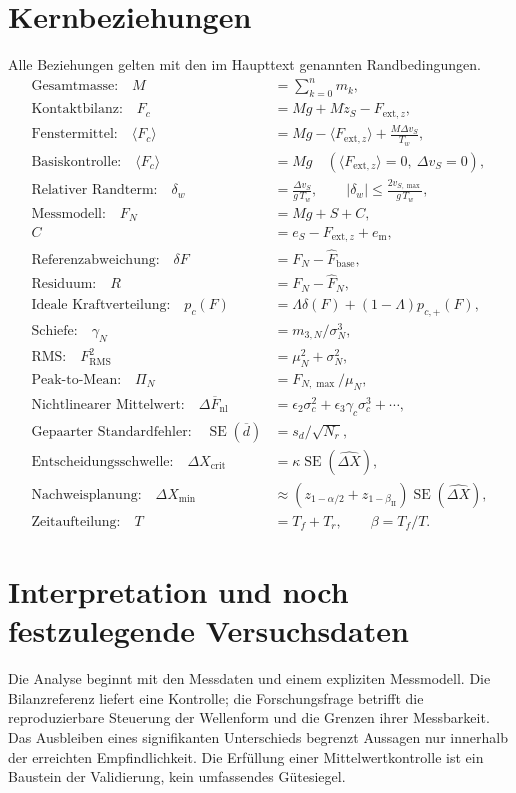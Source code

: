 \documentclass[11pt,a4paper]{article}
\newcommand{\SE}{\operatorname{SE}}
\begin{document}
\section{Kernbeziehungen}
Alle Beziehungen gelten mit den im Haupttext genannten Randbedingungen.
\begin{align*}
\text{Gesamtmasse:}\quad M&=\sum_{k=0}^{n}m_k,\\
\text{Kontaktbilanz:}\quad F_c&=Mg+M\ddot z_S-F_{\mathrm{ext},z},\\
\text{Fenstermittel:}\quad\langle F_c\rangle&=Mg-\langle F_{\mathrm{ext},z}\rangle+\frac{M\Delta v_S}{T_w},\\
\text{Basiskontrolle:}\quad\langle F_c\rangle&=Mg\quad(\langle F_{\mathrm{ext},z}\rangle=0,\ \Delta v_S=0),\\
\text{Relativer Randterm:}\quad\delta_w&=\frac{\Delta v_S}{g\,T_w},\qquad|\delta_w|\le\frac{2v_{S,\max}}{g\,T_w},\\
\text{Messmodell:}\quad F_N&=Mg+S+C,\\
C&=e_S-F_{\mathrm{ext},z}+e_{\mathrm m},\\
\text{Referenzabweichung:}\quad\delta F&=F_N-\hat F_{\mathrm{base}},\\
\text{Residuum:}\quad R&=F_N-\hat F_N,\\
\text{Ideale Kraftverteilung:}\quad p_c(F)&=\Lambda\delta(F)+(1-\Lambda)p_{c,+}(F),\\
\text{Schiefe:}\quad\gamma_N&=m_{3,N}/\sigma_N^3,\\
\text{RMS:}\quad F_{\mathrm{RMS}}^2&=\mu_N^2+\sigma_N^2,\\
\text{Peak-to-Mean:}\quad\Pi_N&=F_{N,\max}/\mu_N,\\
\text{Nichtlinearer Mittelwert:}\quad\Delta\overline F_{\mathrm{nl}}&=\epsilon_2\sigma_c^2+\epsilon_3\gamma_c\sigma_c^3+\cdots,\\
\text{Gepaarter Standardfehler:}\quad\SE(\overline d)&=s_d/\sqrt{N_r},\\
\text{Entscheidungsschwelle:}\quad\Delta X_{\mathrm{crit}}&=\kappa\SE(\widehat{\Delta X}),\\
\text{Nachweisplanung:}\quad\Delta X_{\min}&\approx(z_{1-\alpha/2}+z_{1-\beta_{\mathrm{II}}})\SE(\widehat{\Delta X}),\\
\text{Zeitaufteilung:}\quad T&=T_f+T_r,\qquad\beta=T_f/T.
\end{align*}

\section{Interpretation und noch festzulegende Versuchsdaten}
Die Analyse beginnt mit den Messdaten und einem expliziten Messmodell. Die Bilanzreferenz liefert eine Kontrolle; die Forschungsfrage betrifft die reproduzierbare Steuerung der Wellenform und die Grenzen ihrer Messbarkeit. Das Ausbleiben eines signifikanten Unterschieds begrenzt Aussagen nur innerhalb der erreichten Empfindlichkeit. Die Erfüllung einer Mittelwertkontrolle ist ein Baustein der Validierung, kein umfassendes Gütesiegel.
\end{document}
